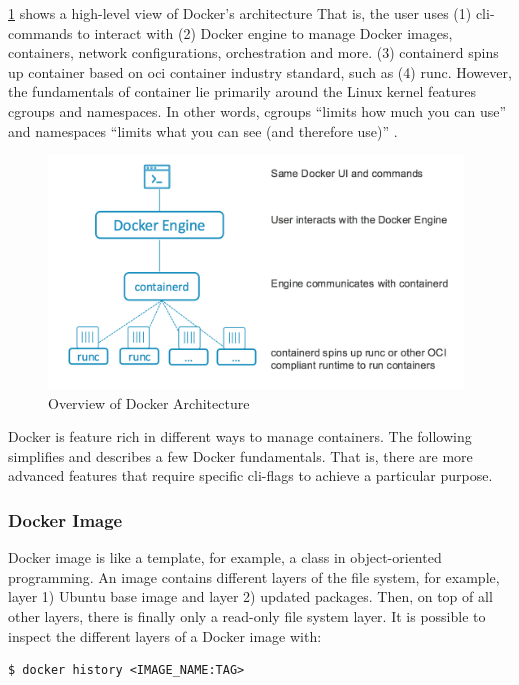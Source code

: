 \skippara \cref{fig:arch} shows a high-level view of Docker's architecture
That is, the user uses (1) \gls{cli}-commands to interact with (2) Docker engine to manage Docker images, containers, network configurations, orchestration and more.
(3) containerd spins up container based on \gls{oci} container industry standard, such as (4) runc.
However, the fundamentals of container lie primarily around the Linux kernel features cgroups and namespaces.
In other words, cgroups ``limits how much you can use'' and namespaces ``limits what you can see (and therefore use)'' \cite{Anatomyo69:online}.

\begin{figure}[h!]
    \centering
    \includegraphics[width=11cm]{figure/dockerarchblog}
    \caption{Overview of Docker Architecture~\cite{Docker1199:online}}
    \label{fig:arch}
\end{figure}

\skippara Docker is feature rich in different ways to manage containers.
The following simplifies and describes a few Docker fundamentals.
That is, there are more advanced features that require specific \gls{cli}-flags to achieve a particular purpose.

\subsubsection{Docker Image}
Docker image is like a template, for example, a class in object-oriented programming.
An image contains different layers of the file system, for example, layer 1) Ubuntu base image and layer 2) updated packages.
Then, on top of all other layers, there is finally only a read-only file system layer.
It is possible to inspect the different layers of a Docker image with:
\begin{lstlisting}[numbers=none, frame=single]
  $ docker history <IMAGE_NAME:TAG>
\end{lstlisting}

